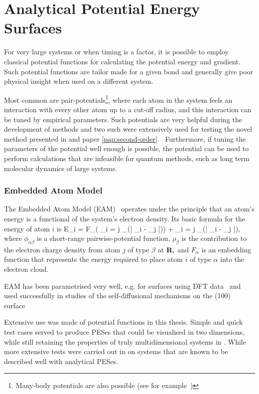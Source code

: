 \section{Analytical Potential Energy Surfaces}
\label{sec:potentials}

For very large systems or when timing is a factor, it is possible to employ classical potential functions for calculating the potential energy and gradient.
Such potential functions are tailor made for a given bond and generally give poor physical insight when used on a different system.

Most common are pair-potentials\footnote{Many-body potentials are also possible (see for example~\cite{stillinger-weber-potential})}, where each atom in the system feels an interaction with every other atom up to a cut-off radius, and this interaction can be tuned by empirical parameters.
Such potentials are very helpful during the development of methods and two such were extensively used for testing the novel method presented in  and paper \ref{pap:second-order}.~\cite{eam-1983, eam-1986, emt-1987, emt-1996}
Furthermore, if tuning the parameters of the potential well enough is possible, the potential can be used to perform calculations that are infeasible for quantum methods, such as long term molecular dynamics of large systems.~\citemiss

\subsubsection{Embedded Atom Model}
The Embedded Atom Model (EAM)~\cite{eam-1983} operates under the principle that an atom's energy is a functional of the system's electron density.
Its basic formula for the energy of atom $i$ is
E_i = F_\alpha \left( \sum_{i \not= j} \rho_\beta(\left| \vR_i - \vR_j \right|)\right) +  \sum_{i \not= j}   \phi_{\alpha\beta}(\left| \vR_i - \vR_j \right|),
\eeq
where $\phi_{\alpha\beta}$ is a short-range pairwise-potential function, $\rho_\beta$ is the contribution to the electron charge density from atom $j$ of type $\beta$ at ${\mathrm{\mathbf{\bm{R}}}}_i$ and $F_\alpha$ is an embedding function that represents the energy required to place atom $i$ of type $\alpha$ into the electron cloud.

EAM has been parametrised very well, e.g. for  surfaces using DFT data~\cite{eam-1986} and used successfully in studies of the self-diffusional mechanisms on the (100) surface~\cite{dimer-original-1999}

Extensive use was made of potential functions in this thesis.
Simple and quick test cases served to produce PESes that could be visualised in two dimensions, while still retaining the properties of truly multidimensional systems in .
While more extensive tests were carried out in  on systems that are known to be described well with analytical PESes.

